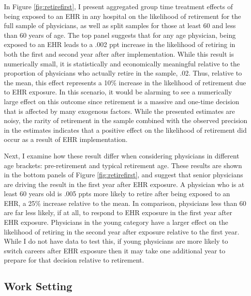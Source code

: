 \documentclass[11pt]{article}
\begin{document}
In Figure \ref{fig:retirefirst}, I present aggregated group time treatment effects of being exposed to an EHR in any hospital on the likelihood of retirement for the full sample of physicians, as well as split samples for those at least 60 and less than 60 years of age. The top panel suggests that for any age physician, being exposed to an EHR leads to a .002 ppt increase in the likelihood of retiring in both the first and second year after after implementation. While this result is numerically small, it is statistically and economically meaningful relative to the proportion of physicians who actually retire in the sample, .02. Thus, relative to the mean, this effect represents a 10\% increase in the likelihood of retirement due to EHR exposure. In this scenario, it would be alarming to see a numerically large effect on this outcome since retirement is a massive and one-time decision that is affected by many exogenous factors. While the presented estimates are noisy, the rarity of retirement in the sample combined with the observed precision in the estimates indicates that a positive effect on the likelihood of retirement did occur as a result of EHR implementation.


Next, I examine how these result differ when considering physicians in different age brackets: pre-retirement and typical retirement age. These results are shown in the bottom panels of Figure \ref{fig:retirefirst}, and suggest that senior physicians are driving the result in the first year after EHR exposure. A physician who is at least 60 years old is .005 ppts more likely to retire after being exposed to an EHR, a 25\% increase relative to the mean. In comparison, physicians less than 60 are far less likely, if at all, to respond to EHR exposure in the first year after EHR exposure. Physicians in the young category have a larger effect on the likelihood of retiring in the second year after exposure relative to the first year. While I do not have data to test this, if young physicians are more likely to switch careers after EHR exposure then it may take one additional year to prepare for that decision relative to retirement.   



\subsection{Work Setting}
\end{document}
